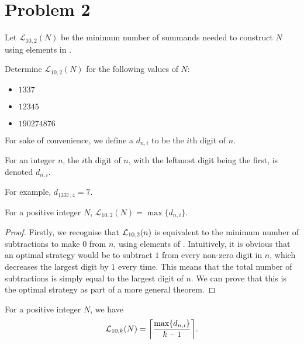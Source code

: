 \documentclass{article}
\begin{document}
\section{Problem 2}
\begin{definition}
  Let $\mathcal{L}_{10, 2}(N)$ be the minimum number of summands needed to construct $N$ using elements in \NTen.
\end{definition}
\begin{problem}\label{p2}
Determine $\mathcal{L}_{10, 2}(N)$ for the following values of $N$:
\begin{itemize}
  \item $1337$
  \item  $12345$
  \item  $190274876$
\end{itemize}
\end{problem}
For sake of convenience, we define a $d_{n, i}$ to be the $i$th digit of $n$.
\begin{definition}
  For an integer $n$, the $i$th digit of  $n$, with the leftmost digit being the first, is denoted $d_{n, i}$.
\end{definition}
For example, $d_{1337, 4} = 7$.
\begin{theorem}
  For a positive integer $N$, $\mathcal{L}_{10, 2}(N) = \max\{d_{n, i}\}$.
\end{theorem}
\begin{proof}
  Firstly, we recognise that $\mathcal{L}_{10, 2}(n)$ is equivalent to the minimum number of subtractions to make $0$ from $n$, using elements of \NTen. Intuitively, it is obvious that an optimal strategy would be to subtract $1$ from every non-zero digit in $n$, which decreases the largest digit by $1$ every time. This means that the total number of subtractions is simply equal to the largest digit of $n$. We can prove that this is the optimal strategy as part of a more general theorem.
\end{proof}
\begin{theorem}
  For a positive integer $N$, we have \[\mathcal{L}_{10, k}(N) = \ceil*{\frac{\max\{d_{n, i}\}}{k-1}}.\]
\end{theorem}
\end{document}
